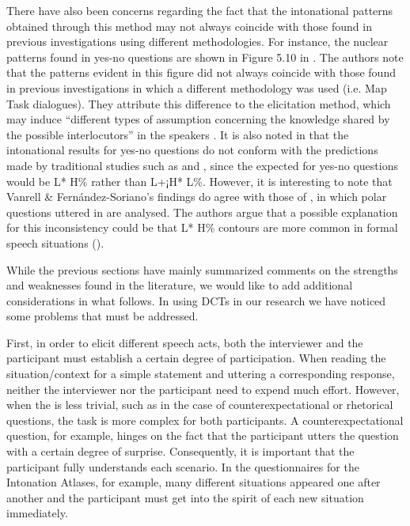 \documentclass[output=paper]{LSP/langsci}
\begin{document}
There have also been concerns regarding the fact that the intonational patterns obtained through this method may not always coincide with those found in previous investigations using different methodologies. For instance, the nuclear patterns found in  yes-no questions are shown in Figure 5.10 in \citet[169]{GiliFivelaETAL2015intonationalvariation}. The authors note that the patterns evident in this figure did not always coincide with those found in previous investigations in which a different methodology was used (i.e. Map Task dialogues). They attribute this difference to the elicitation method, which may induce “different types of assumption concerning the knowledge shared by the possible interlocutors” in the speakers \citep[168]{GiliFivelaETAL2015intonationalvariation}. It is also noted in \citet{Vanrell2014dialectinterrogatives} that the intonational results for   yes-no questions do not conform with the predictions made by traditional studies such as \citet{NavarroTomas.1944} and \citet{Quilis1981}, since the expected  for   yes-no questions would be L* H\% rather than L+¡H* L\%. However, it is interesting to note that Vanrell \& Fernández-Soriano’s findings do agree with those of \citet{Henriksen2016}, in which polar questions uttered in  are analysed. The authors argue that a possible explanation for this inconsistency could be that L* H\% contours are more common in formal speech situations (\citealt{Henriksen2013,Henriksen2016}).

While the previous sections have mainly summarized comments on the \linebreak strengths and weaknesses found in the literature, we would like to add additional considerations in what follows. In using DCTs in our research we have noticed some problems that must be addressed.

First, in order to elicit different speech acts, both the interviewer and the participant must establish a certain degree of participation. When reading the situation/context for a simple statement and uttering a corresponding response, neither the interviewer nor the participant need to expend much effort. However, when the  is less trivial, such as in the case of counterexpectational or rhetorical questions, the task is more complex for both participants. A counterexpectational question, for example, hinges on the fact that the participant utters the question with a certain degree of surprise. Consequently, it is important that the participant fully understands each scenario. In the questionnaires for the Intonation Atlases, for example, many different situations appeared one after another and the participant must get into the spirit of each new situation immediately.
\end{document}
